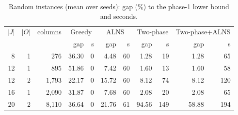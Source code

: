 \begin{table}[t]\centering\small\setlength{\tabcolsep}{4pt}
\caption{Random instances (mean over seeds): gap (\%) to the phase-1 lower bound and seconds.}\label{tab:scal}
\begin{tabular}{rrrrrrrrrrr}\toprule
$|J|$ & $|O|$ & columns & \multicolumn{2}{c}{Greedy} & \multicolumn{2}{c}{ALNS} & \multicolumn{2}{c}{Two-phase} & \multicolumn{2}{c}{Two-phase+ALNS}\\
 & & & gap & s & gap & s & gap & s & gap & s\\\midrule
8 & 1 & 276 & 36.30 & 0 & 4.48 & 60 & 1.28 & 19 & 1.28 & 65\\
12 & 1 & 895 & 51.86 & 0 & 7.42 & 60 & 1.60 & 13 & 1.60 & 58\\
12 & 2 & 1,793 & 22.17 & 0 & 15.72 & 60 & 8.12 & 74 & 8.12 & 120\\
16 & 1 & 2,090 & 31.87 & 0 & 7.68 & 60 & 2.08 & 20 & 2.08 & 65\\
20 & 2 & 8,110 & 36.64 & 0 & 21.76 & 61 & 94.56 & 149 & 58.88 & 194\\
\bottomrule\end{tabular}\end{table}
